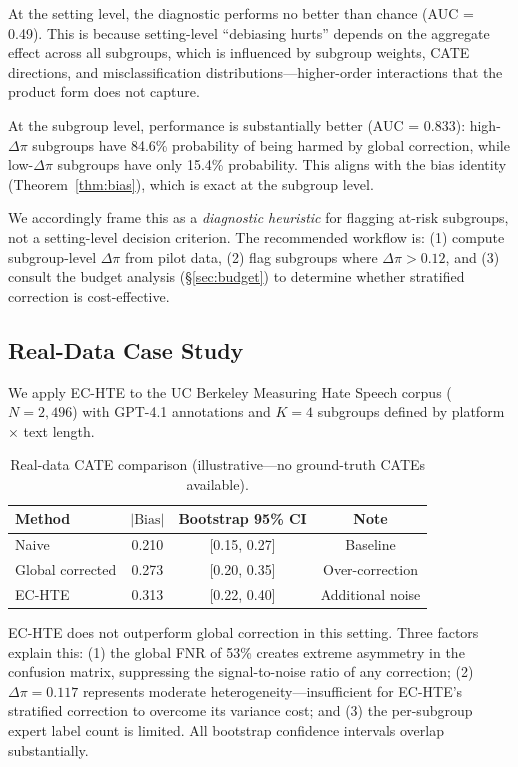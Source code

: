 \documentclass[11pt,a4paper]{article}
\newcommand{\DeltaPi}{\Delta\pi}
\begin{document}
At the setting level, the diagnostic performs no better than chance (AUC = 0.49).
This is because setting-level ``debiasing hurts'' depends on the aggregate effect across all subgroups, which is influenced by subgroup weights, CATE directions, and misclassification distributions---higher-order interactions that the product form does not capture.

At the subgroup level, performance is substantially better (AUC = 0.833): high-$\DeltaPi$ subgroups have 84.6\% probability of being harmed by global correction, while low-$\DeltaPi$ subgroups have only 15.4\% probability.
This aligns with the bias identity (Theorem~\ref{thm:bias}), which is exact at the subgroup level.

We accordingly frame this as a \emph{diagnostic heuristic} for flagging at-risk subgroups, not a setting-level decision criterion.
The recommended workflow is: (1) compute subgroup-level $\DeltaPi$ from pilot data, (2) flag subgroups where $\DeltaPi > 0.12$, and (3) consult the budget analysis (\S\ref{sec:budget}) to determine whether stratified correction is cost-effective.


\subsection{Real-Data Case Study}\label{sec:realdata}

We apply EC-HTE to the UC Berkeley Measuring Hate Speech corpus \citep{kennedy2020constructing} ($N = 2{,}496$) with GPT-4.1 annotations and $K=4$ subgroups defined by platform $\times$ text length.

\begin{table}[t]
\centering
\small
\caption{Real-data CATE comparison (illustrative---no ground-truth CATEs available).}
\label{tab:realdata}
\begin{tabular}{@{}lccc@{}}
\toprule
Method & $|\text{Bias}|$ & Bootstrap 95\% CI & Note \\
\midrule
Naive & 0.210 & [0.15, 0.27] & Baseline \\
Global corrected & 0.273 & [0.20, 0.35] & Over-correction \\
EC-HTE & 0.313 & [0.22, 0.40] & Additional noise \\
\bottomrule
\end{tabular}
\end{table}

EC-HTE does not outperform global correction in this setting.
Three factors explain this: (1) the global FNR of 53\% creates extreme asymmetry in the confusion matrix, suppressing the signal-to-noise ratio of any correction; (2) $\DeltaPi = 0.117$ represents moderate heterogeneity---insufficient for EC-HTE's stratified correction to overcome its variance cost; and (3) the per-subgroup expert label count is limited.
All bootstrap confidence intervals overlap substantially.
\end{document}
